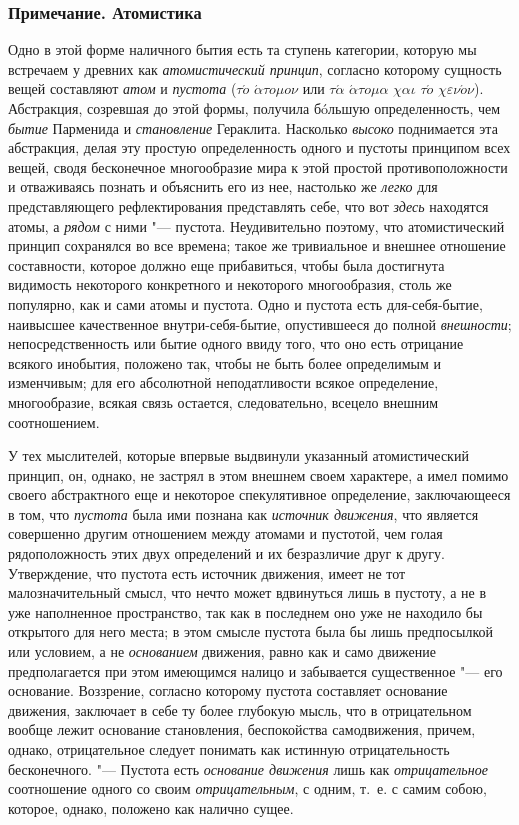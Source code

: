 \subsubsection[Примечание. Атомистика]{Примечание. Атомистика}

Одно в этой форме наличного бытия есть та ступень категории, которую мы
встречаем у древних как {\em атомистический принцип},
согласно которому сущность вещей составляют {\em атом}
и {\em пустота} ($\tau \acute{o}$
$\acute{\alpha} \tau o \mu o \nu $ или $\tau \acute{\alpha}$
$\acute{\alpha} \tau o \mu \alpha $ $\chi \alpha \iota $
$\tau \acute{o}$ $\chi \varepsilon \nu \acute{o} \nu $).
Абстракция, созревшая до этой формы, получила бóльшую определенность, чем
{\em бытие} Парменида и
{\em становление} Гераклита. Насколько
{\em высоко} поднимается эта абстракция, делая эту
простую определенность одного и пустоты принципом всех вещей, сводя
бесконечное многообразие мира к этой простой противоположности и
отваживаясь познать и объяснить его из нее, настолько же
{\em легко} для представляющего рефлектирования
представлять себе, что вот {\em здесь} находятся атомы,
а {\em рядом} с ними "--- пустота. Неудивительно поэтому,
что атомистический принцип сохранялся во все времена; такое же тривиальное
и внешнее отношение составности, которое должно еще прибавиться, чтобы была
достигнута видимость некоторого конкретного и некоторого многообразия,
столь же популярно, как и сами атомы и пустота. Одно и пустота есть
для-себя-бытие, наивысшее качественное внутри-себя-бытие, опустившееся до
полной {\em внешности}; непосредственность или бытие
одного ввиду того, что оно есть отрицание всякого инобытия, положено так,
чтобы не быть более определимым и изменчивым; для его абсолютной
неподатливости всякое определение, многообразие, всякая связь остается,
следовательно, всецело внешним соотношением.

У тех мыслителей, которые впервые выдвинули указанный атомистический
принцип, он, однако, не застрял в этом внешнем своем характере, а имел
помимо своего абстрактного еще и некоторое спекулятивное определение,
заключающееся в том, что {\em пустота} была ими познана
как {\em источник движения}, что является совершенно
другим отношением между атомами и пустотой, чем голая рядоположность этих
двух определений и их безразличие друг к другу. Утверждение, что пустота
есть источник движения, имеет не тот малозначительный смысл, что нечто
может вдвинуться лишь в пустоту, а не в уже наполненное пространство, так
как в последнем оно уже не находило бы открытого для него места; в этом
смысле пустота была бы лишь предпосылкой или условием, а не
{\em основанием} движения, равно как и само движение
предполагается при этом имеющимся налицо и забывается существенное "--- его
основание. Воззрение, согласно которому пустота составляет основание
движения, заключает в себе ту более глубокую мысль, что в отрицательном
вообще лежит основание становления, беспокойства самодвижения, причем,
однако, отрицательное следует понимать как истинную отрицательность
бесконечного. "--- Пустота есть {\em основание движения}
лишь как {\em отрицательное} соотношение одного со
своим {\em отрицательным}, с одним, т.~е. с самим
собою, которое, однако, положено как налично сущее.

